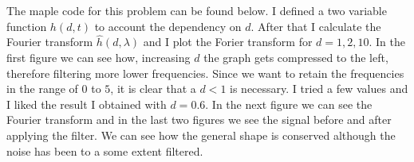 \begin{questions}

\begin{solution}
The maple code for this problem can be found below. I defined a two variable function $h(d,t)$ to account the dependency on $d$. After that I calculate the Fourier transform $\hat{h}(d,\lambda)$ and I plot the Forier transform for $d=1,2,10$. In the first figure we can see how, increasing $d$ the graph gets compressed to the left, therefore filtering more lower frequencies. Since we want to retain the frequencies in the range of $0$ to $5$, it is clear that a $d<1$ is necessary. I tried a few values and I liked the result I obtained with $d=0.6$. In the next figure we can see the Fourier transform and in the last two figures we see the signal before and after applying the filter. We can see how the general shape is conserved although the noise has been to a some extent filtered.
\end{solution}
\end{questions}

